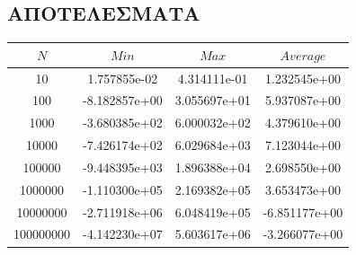 \documentclass{FR16}
\begin{document}
\subsection{ΑΠΟΤΕΛΕΣΜΑΤΑ}
\begin{center}
\begin{tabular}{c c c c}
\arrayrulecolor{Azzurro}
\hline
{\bfseries $Ν$} & {\bfseries $Min$} & {\bfseries $Max$} & {\bfseries $Average$}\\
\hline
10    & 1.757855e-02 & 4.314111e-01 & 1.232545e+00 \\
100   & -8.182857e+00 & 3.055697e+01 & 5.937087e+00 \\
1000  & -3.680385e+02 & 6.000032e+02  & 4.379610e+00 \\
10000 & -7.426174e+02 & 6.029684e+03 & 7.123044e+00 \\
100000 & -9.448395e+03 & 1.896388e+04  & 2.698550e+00  \\
1000000 & -1.110300e+05  & 2.169382e+05  & 3.653473e+00 \\
10000000 & -2.711918e+06 &  6.048419e+05 & -6.851177e+00 \\
100000000 & -4.142230e+07  & 5.603617e+06  & -3.266077e+00 \\


\hline
\end{tabular}
\end{center}
\newpage
\end{document}
